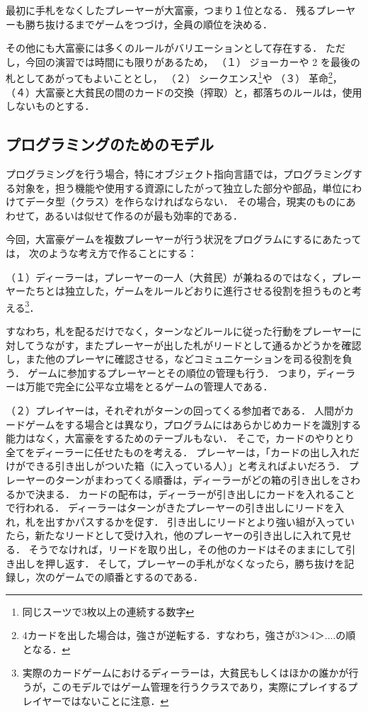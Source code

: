 最初に手札をなくしたプレーヤーが大富豪，つまり１位となる．
残るプレーヤーも勝ち抜けるまでゲームをつづけ，全員の順位を決める．

その他にも大富豪には多くのルールがバリエーションとして存在する．
ただし，今回の演習では時間にも限りがあるため，
（１） ジョーカーや 2 を最後の札としてあがってもよいこととし，
（２） シークエンス\footnote{同じスーツで3枚以上の連続する数字}や
（３） 革命\footnote{4カードを出した場合は，強さが逆転する．すなわち，強さが3＞4＞....の順となる．}，
（４）大富豪と大貧民の間のカードの交換（搾取）と，都落ちのルールは，使用しないものとする．

\subsection*{プログラミングのためのモデル}
プログラミングを行う場合，特にオブジェクト指向言語では，プログラミングする対象を，担う機能や使用する資源にしたがって独立した部分や部品，単位にわけてデータ型（クラス）を作らなければならない．
その場合，現実のものにあわせて，あるいは似せて作るのが最も効率的である．

今回，大富豪ゲームを複数プレーヤーが行う状況をプログラムにするにあたっては，
次のような考え方で作ることにする：

（１）ディーラーは，プレーヤーの一人（大貧民）が兼ねるのではなく，プレーヤーたちとは独立した，ゲームをルールどおりに進行させる役割を担うものと考える\footnote{実際のカードゲームにおけるディーラーは，大貧民もしくはほかの誰かが行うが，このモデルではゲーム管理を行うクラスであり，実際にプレイするプレイヤーではないことに注意．}．

すなわち，札を配るだけでなく，ターンなどルールに従った行動をプレーヤーに対してうながす，またプレーヤーが出した札がリードとして通るかどうかを確認し，また他のプレーヤに確認させる，などコミュニケーションを司る役割を負う．
ゲームに参加するプレーヤーとその順位の管理も行う．
つまり，ディーラーは万能で完全に公平な立場をとるゲームの管理人である．

（２）プレイヤーは，それぞれがターンの回ってくる参加者である．
人間がカードゲームをする場合とは異なり，プログラムにはあらかじめカードを識別する能力はなく，大富豪をするためのテーブルもない．
そこで，カードのやりとり全てをディーラーに任せたものを考える．
プレーヤーは，「カードの出し入れだけができる引き出しがついた箱（に入っている人）」と考えればよいだろう．
プレーヤーのターンがまわってくる順番は，ディーラーがどの箱の引き出しをさわるかで決まる．
カードの配布は，ディーラーが引き出しにカードを入れることで行われる．
ディーラーはターンがきたプレーヤーの引き出しにリードを入れ，札を出すかパスするかを促す．
引き出しにリードとより強い組が入っていたら，新たなリードとして受け入れ，他のプレーヤーの引き出しに入れて見せる．
そうでなければ，リードを取り出し，その他のカードはそのままにして引き出しを押し返す．
そして，プレーヤーの手札がなくなったら，勝ち抜けを記録し，次のゲームでの順番とするのである．


